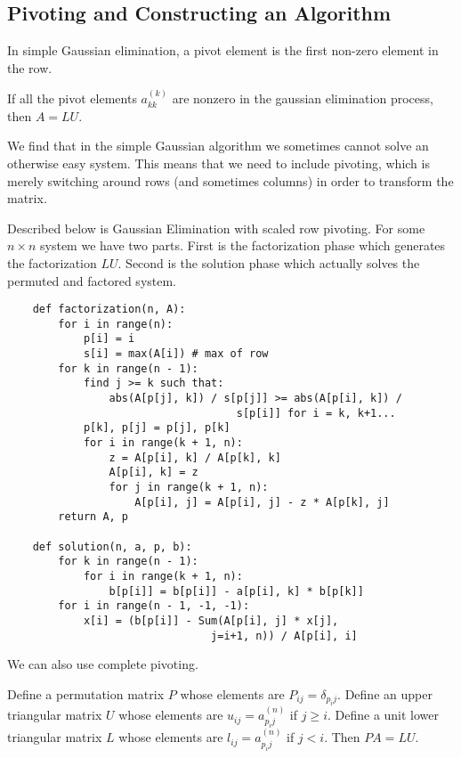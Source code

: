     \subsection{Pivoting and Constructing an Algorithm}
    In simple Gaussian elimination, a pivot element is the first non-zero element in the row.

        \begin{thm}
            If all the pivot elements $a_{kk}^{(k)}$ are nonzero in the gaussian elimination process, then $A = LU$.
        \end{thm}

    We find that in the simple Gaussian algorithm we sometimes cannot solve an otherwise easy system. This means that we
    need to include pivoting, which is merely switching around rows (and sometimes columns) in order to transform the
    matrix.

    Described below is Gaussian Elimination with scaled row pivoting. For some $n \times n$ system we have two parts.
    First is the factorization phase which generates the factorization $LU$. Second is the solution phase which actually
    solves the permuted and factored system.

    \begin{lstlisting}
    def factorization(n, A):
        for i in range(n):
            p[i] = i
            s[i] = max(A[i]) # max of row
        for k in range(n - 1):
            find j >= k such that:
                abs(A[p[j], k]) / s[p[j]] >= abs(A[p[i], k]) /
                                    s[p[i]] for i = k, k+1...
            p[k], p[j] = p[j], p[k]
            for i in range(k + 1, n):
                z = A[p[i], k] / A[p[k], k]
                A[p[i], k] = z
                for j in range(k + 1, n):
                    A[p[i], j] = A[p[i], j] - z * A[p[k], j]
        return A, p

    def solution(n, a, p, b):
        for k in range(n - 1):
            for i in range(k + 1, n):
                b[p[i]] = b[p[i]] - a[p[i], k] * b[p[k]]
        for i in range(n - 1, -1, -1):
            x[i] = (b[p[i]] - Sum(A[p[i], j] * x[j],
                                j=i+1, n)) / A[p[i], i]
    \end{lstlisting}

    We can also use complete pivoting.

    \begin{thm}[$LU$ Factorization of $PA$]
        Define a permutation matrix $P$ whose elements are $P_{ij} = \delta_{p_ij}$. Define an upper triangular matrix
        $U$ whose elements are $u_{ij} = a_{p_ij}^{(n)}$ if $j \ge i$. Define a unit lower triangular matrix $L$ whose
        elements are $l_{ij} = a_{p_ij}^{(n)}$ if $j < i$. Then $PA = LU$.
    \end{thm}

